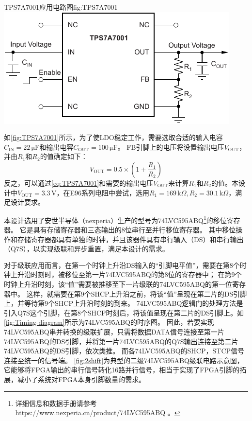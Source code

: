 \documentclass[supercite]{HustGraduPaper}
\begin{document}
\begin{generalfig}[htb]{TPS7A7001应用电路图}{fig:TPS7A7001}
	\includegraphics[width=0.6\linewidth]{Figures/TPS7A7001.pdf}
\end{generalfig}

如\autoref{fig:TPS7A7001}所示，为了使LDO稳定工作，需要选取合适的输入电容$C_\mathrm{IN}=22\,\mathrm{\mu F}$和输出电容$C_\mathrm{OUT}=100\,\mathrm{\mu F}$。
FB引脚上的电压将设置输出电压$V_\mathrm{OUT}$，并由$R_1$和$R_2$的值确定如下：
\begin{equation}
	V_\mathrm{OUT} = 0.5 \times \left(1+\frac{R_1}{R_2}\right)  
	\label{eq:TPS7A7001}
\end{equation}
反之，可以通过\autoref{eq:TPS7A7001}和需要的输出电压$V_\mathrm{OUT}$来计算$R_1$和$R_2$的值。本设计中$V_\mathrm{OUT} = 3.3 \, \mathrm{V}$，在E96系列电阻中尝试，选用$R_1=169\, \mathrm{k}\Omega , R_2=30.1\, \mathrm{k}\Omega $，满足设计要求。


本设计选用了安世半导体（nexperia）生产的型号为74LVC595ABQ\footnote{详细信息和数据手册请参考 https://www.nexperia.cn/product/74LVC595ABQ 。}的移位寄存器。
它是具有存储寄存器和三态输出的8位串行至并行移位寄存器。
其中移位操作和存储寄存器都具有单独的时钟，并且该器件具有串行输入（DS）和串行输出（Q7S），以实现级联和异步重置，满足本设计的需求。

对于级联应用而言，在第一个时钟上升沿DS输入的“引脚电平值”，需要在第8个时钟上升沿时刻时，被移位至第一片74LVC595ABQ的第8位的寄存器中；
在第9个时钟上升沿时刻，该“值”需要被推移至下一片级联的74LVC595ABQ的第一位寄存器中。
这样，就需要在第9个SHCP上升沿之前，将该“值”呈现在第二片的DS引脚上，并等待第9个SHCP上升沿时刻的到来。
74LVC595ABQ逻辑门的处理方法是引入Q7S这个引脚，在第8个SHCP时刻后，将该值呈现在第二片的DS引脚上。如\autoref{fig:Timing-diagram}所示为74LVC595ABQ的时序图。
因此，若要实现74LVC595ABQ串并转换的级联扩展，只需将数据DATA信号连接至第一片74LVC595ABQ的DS引脚，并将第一片74LVC595ABQ的Q7S输出连接至第二片74LVC595ABQ的DS引脚，依次类推。
而各74LVC595ABQ的SHCP，STCP信号连接至统一的信号端。
\autoref{fig:2shift}为典型的二级74LVC595ABQ级联电路示意图，它能够将FPGA输出的串行信号转化16路并行信号，相当于实现了FPGA引脚的拓展，减小了系统对FPGA本身引脚数量的需求。
\end{document}

